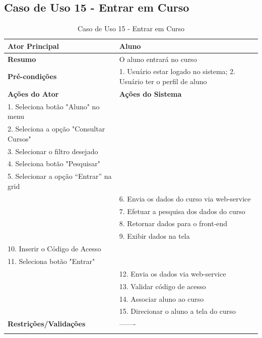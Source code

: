 \subsection{Caso de Uso 15 - Entrar em Curso}
\label{sc:case15}
\begin{center}
\begin{longtable}{p{8cm}|p{8cm}}
    \hline
    \textbf{Ator Principal} & Aluno \\
    \hline
    \textbf{Resumo} & O aluno entrará no curso \\
    \hline
    \textbf{Pr\'{e}-condi\c{c}\~{o}es} & 1. Usuário estar logado no sistema; 2. Usuário ter o perfil de aluno \\
    \hline
    \textbf{A\c{c}\~{o}es do Ator} & \textbf{A\c{c}\~{o}es do Sistema} \\
    \hline
    1. Seleciona botão "Aluno" no menu \\
    \hline
    2. Seleciona a opção "Consultar Cursos" \\
	\hline
    3. Selecionar o filtro desejado \\
	\hline
    4. Seleciona botão "Pesquisar" \\
	\hline
    5. Selecionar a opção “Entrar” na grid \\
    \hline
    & 6. Envia os dados do curso via web-service \\
	\hline
    & 7. Efetuar a pesquisa dos dados do curso \\
	\hline
    & 8. Retornar dados para o front-end \\
	\hline
    & 9. Exibir dados na tela \\
	\hline
    10. Inserir o Código de Acesso \\
	\hline
    11. Seleciona botão "Entrar" \\
	\hline
    & 12. Envia os dados via web-service \\
	\hline
    & 13. Validar código de acesso \\
	\hline
    & 14. Associar aluno ao curso \\
	\hline
    & 15. Direcionar o aluno a tela do curso \\
    \hline
    \hline
    \textbf{Restri\c{c}\~{o}es/Valida\c{c}\~{o}es} & -------\\
\hline
\caption{Caso de Uso 15 - Entrar em Curso}
\end{longtable}
\end{center}


